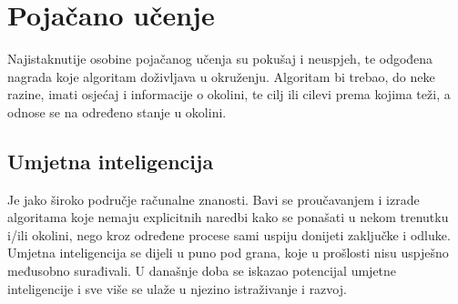 \section{Pojačano učenje}
Najistaknutije osobine pojačanog učenja su pokušaj i neuspjeh, te odgođena nagrada koje algoritam doživljava u okruženju. Algoritam bi trebao, do neke razine, imati osjećaj i informacije o okolini, te cilj ili cilevi prema kojima teži, a odnose se na određeno stanje u okolini.

\subsection{Umjetna inteligencija}
Je jako široko područje računalne znanosti. Bavi se proučavanjem i izrade algoritama koje nemaju explicitnih naredbi kako se ponašati u nekom trenutku i/ili okolini, nego kroz određene procese sami uspiju donijeti zaključke i odluke. Umjetna inteligencija se dijeli u puno pod grana, koje u prošlosti nisu uspješno međusobno surađivali. U današnje doba se iskazao potencijal umjetne inteligencije i sve više se ulaže u njezino istraživanje i razvoj. 

